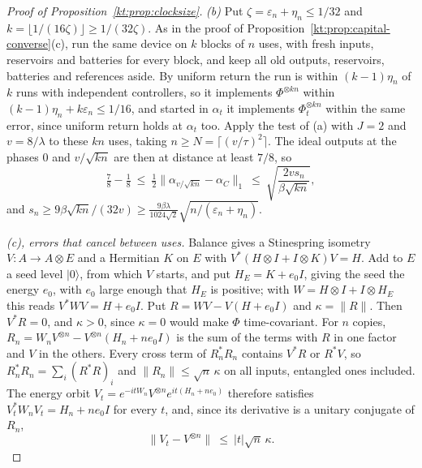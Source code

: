 \begin{proof}[Proof of Proposition~\ref{kt:prop:clocksize}]
\emph{(b)} Put $\zeta=\varepsilon_n+\eta_n\le1/32$ and $k=\lfloor1/(16\zeta)\rfloor\ge1/(32\zeta)$. As in the proof of Proposition~\ref{kt:prop:capital-converse}(c), run the same device on $k$ blocks of $n$ uses, with fresh inputs, reservoirs and batteries for every block, and keep all old outputs, reservoirs, batteries and references aside. By uniform return the run is within $(k-1)\eta_n$ of $k$ runs with independent controllers, so it implements $\Phi^{\otimes kn}$ within $(k-1)\eta_n+k\varepsilon_n\le1/16$, and started in $\alpha_t$ it implements $\Phi_t^{\otimes kn}$ within the same error, since uniform return holds at $\alpha_t$ too. Apply the test of (a) with $J=2$ and $v=8/\lambda$ to these $kn$ uses, taking $n\ge N=\lceil(v/\tau)^2\rceil$. The ideal outputs at the phases $0$ and $v/\sqrt{kn}$ are then at distance at least $7/8$, so
\[
\tfrac78-\tfrac18\ \le\ \tfrac12\|\alpha_{v/\sqrt{kn}}-\alpha_C\|_1\ \le\ \sqrt{\frac{2vs_n}{\beta\sqrt{kn}}},
\]
and $s_n\ge9\beta\sqrt{kn}/(32v)\ge\frac{9\beta\lambda}{1024\sqrt2}\sqrt{n/(\varepsilon_n+\eta_n)}$.

\emph{(c), errors that cancel between uses.} Balance gives a Stinespring isometry $V:A\to A\otimes E$ and a Hermitian $K$ on $E$ with $V^*(H\otimes I+I\otimes K)V=H$. Add to $E$ a seed level $|0\rangle$, from which $V$ starts, and put $H_E=K+e_0I$, giving the seed the energy $e_0$, with $e_0$ large enough that $H_E$ is positive; with $W=H\otimes I+I\otimes H_E$ this reads $V^*WV=H+e_0I$. Put $R=WV-V(H+e_0I)$ and $\kappa=\|R\|$. Then $V^*R=0$, and $\kappa>0$, since $\kappa=0$ would make $\Phi$ time-covariant. For $n$ copies, $R_n=W_nV^{\otimes n}-V^{\otimes n}(H_n+ne_0I)$ is the sum of the terms with $R$ in one factor and $V$ in the others. Every cross term of $R_n^*R_n$ contains $V^*R$ or $R^*V$, so $R_n^*R_n=\sum_i(R^*R)_i$ and $\|R_n\|\le\sqrt n\,\kappa$ on all inputs, entangled ones included. The energy orbit $V_t=e^{-itW_n}V^{\otimes n}e^{it(H_n+ne_0)}$ therefore satisfies $V_t^*W_nV_t=H_n+ne_0I$ for every $t$, and, since its derivative is a unitary conjugate of $R_n$,
\[
\|V_t-V^{\otimes n}\|\ \le\ |t|\sqrt n\,\kappa.
\]


\end{proof}
